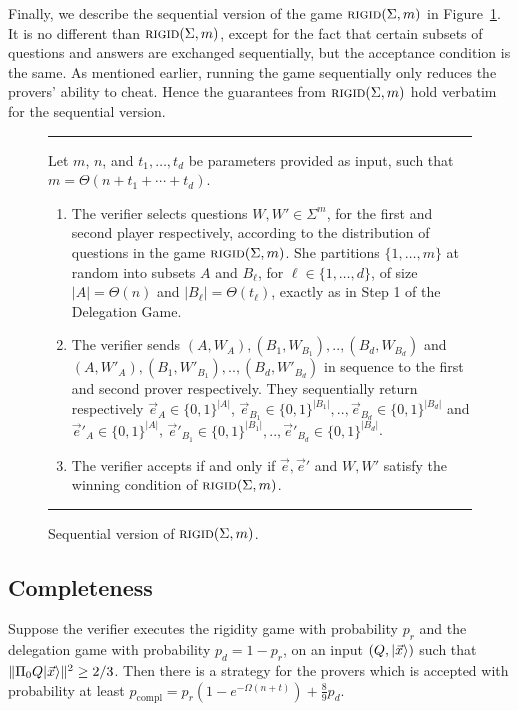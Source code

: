 Finally, we describe the sequential version of the game $\textsc{rigid}(\Sigma,m)$ in
Figure~\ref{fig:consistency-game}. It is no different than $\textsc{rigid}(\Sigma,m)$,
except for the fact that certain subsets of questions and answers are exchanged
sequentially, but the acceptance condition is the same. As mentioned earlier,
running the game sequentially only reduces the provers' ability to cheat. Hence the guarantees from $\textsc{rigid}(\Sigma,m)$ 
hold verbatim for the sequential version. 

\begin{figure}[H]
\rule[1ex]{\textwidth}{0.5pt}
\vspace{-25pt}
\justify 
Let $m$, $n$, and $t_1,\ldots,t_d$ be parameters provided as input, such that $m = \Theta(n+t_1+\cdots+t_d)$. 
\begin{enumerate}
\item The verifier selects questions $W,W' \in \Sigma^{m}$, for the first and second player respectively, according to the distribution of questions in the game $\textsc{rigid}(\Sigma,m)$. She partitions $\{1,\ldots,m\}$ at random into subsets $A$ and $B_\ell$, for $\ell\in\{1,\ldots,d\}$, of size $|A|=\Theta(n)$ and $|B_\ell|=\Theta(t_\ell)$, exactly as in Step 1 of the Delegation Game. 
\item The verifier sends $(A,W_A), (B_1,W_{B_1}),.., (B_d,W_{B_d})$ and $(A,W'_A), (B_1,W'_{B_1}), .., (B_d,W'_{B_d})$ in sequence to the first and second prover respectively. They sequentially return respectively $\vec{e}_A \in \{0,1\}^{|A|}$, $\vec{e}_{B_1} \in \{0,1\}^{|B_1|},.., \vec{e}_{B_d} \in \{0,1\}^{|B_d|}$ and $\vec{e}'_A \in \{0,1\}^{|A|}$, $\vec{e}'_{B_1} \in \{0,1\}^{|B_1|},.., \vec{e}'_{B_d} \in \{0,1\}^{|B_d|}$.
\item The verifier accepts if and only if $\vec{e},\vec{e}'$ and $W,W'$ satisfy the winning condition of $\textsc{rigid}(\Sigma,m)$.
\end{enumerate}
\rule[2ex]{\textwidth}{0.5pt}\vspace{-.5cm}
\caption{Sequential version of $\textsc{rigid}(\Sigma,m)$.}
\label{fig:consistency-game}
\end{figure} 




\subsection{Completeness}

\begin{lemma}\label{lem:leash-completeness}
Suppose the verifier executes the rigidity game with probability $p_r$ and the delegation game with probability $p_d=1-p_r$, on an input $(Q,|\vec{x}\rangle)$ such that $\|\Pi_0 Q |\vec{x}\rangle\|^2 \geq 2/3$. Then there is a strategy for the provers which is accepted with probability at least $p_{\mathrm{compl}} = p_r(1-e^{-\Omega(n+t)}) + \frac{8}{9}p_d$. 
\end{lemma}

